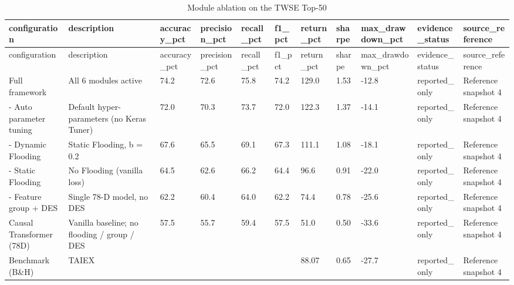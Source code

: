 \begin{landscape}
\begin{longtable}{lllllllllll}
\caption{Module ablation on the TWSE Top-50}\label{tab:evaluation_4} \\
\toprule
configuration & description & accuracy\_pct & precision\_pct & recall\_pct & f1\_pct & return\_pct & sharpe & max\_drawdown\_pct & evidence\_status & source\_reference \\
\midrule
\endfirsthead
\toprule
configuration & description & accuracy\_pct & precision\_pct & recall\_pct & f1\_pct & return\_pct & sharpe & max\_drawdown\_pct & evidence\_status & source\_reference \\
\midrule
\endhead
Full framework & All 6 modules active & 74.2 & 72.6 & 75.8 & 74.2 & 129.0 & 1.53 & -12.8 & reported\_only & Reference snapshot 4 \\
- Auto parameter tuning & Default hyper-parameters (no Keras Tuner) & 72.0 & 70.3 & 73.7 & 72.0 & 122.3 & 1.37 & -14.1 & reported\_only & Reference snapshot 4 \\
- Dynamic Flooding & Static Flooding, b = 0.2 & 67.6 & 65.5 & 69.1 & 67.3 & 111.1 & 1.08 & -18.1 & reported\_only & Reference snapshot 4 \\
- Static Flooding & No Flooding (vanilla loss) & 64.5 & 62.6 & 66.2 & 64.4 & 96.6 & 0.91 & -22.0 & reported\_only & Reference snapshot 4 \\
- Feature group + DES & Single 78-D model, no DES & 62.2 & 60.4 & 64.0 & 62.2 & 74.4 & 0.78 & -25.6 & reported\_only & Reference snapshot 4 \\
Causal Transformer (78D) & Vanilla baseline; no flooding / group / DES & 57.5 & 55.7 & 59.4 & 57.5 & 51.0 & 0.50 & -33.6 & reported\_only & Reference snapshot 4 \\
Benchmark (B\&H) & TAIEX &  &  &  &  & 88.07 & 0.65 & -27.7 & reported\_only & Reference snapshot 4 \\
\bottomrule
\end{longtable}
\end{landscape}
